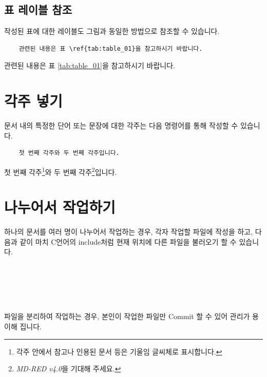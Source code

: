 \subsection{표 레이블 참조}
작성된 표에 대한 레이블도 그림과 동일한 방법으로 참조할 수 있습니다.

\begin{verbatim}
    관련된 내용은 표 \ref{tab:table_01}을 참고하시기 바랍니다. 
\end{verbatim}
관련된 내용은 표 \ref{tab:table_01}을 참고하시기 바랍니다. 

\section{각주 넣기}
문서 내의 특정한 단어 또는 문장에 대한 각주는 다음 명령어를 통해 작성할 수 있습니다.

\begin{verbatim}
    첫 번째 각주와 두 번째 각주입니다.
\end{verbatim}

첫 번째 각주\footnote{각주 안에서 참고나 인용된 문서 등은 기울임 글씨체로 표시합니다.}와
두 번째 각주\footnote{\emph{MD-RED v4.0}을 기대해 주세요.}입니다.

\section{나누어서 작업하기}
하나의 문서를 여러 명이 나누어서 작업하는 경우, 각자 작업할 파일에 작성을 하고, 다음과 같이
마치 C언어의 include처럼 현재 위치에 다른 파일을 불러오기 할 수 있습니다. 

\begin{verbatim}
    
    
    
    
\end{verbatim}

파일을 분리하여 작업하는 경우, 본인이 작업한 파일만 Commit 할 수 있어 관리가 용이해 집니다.

